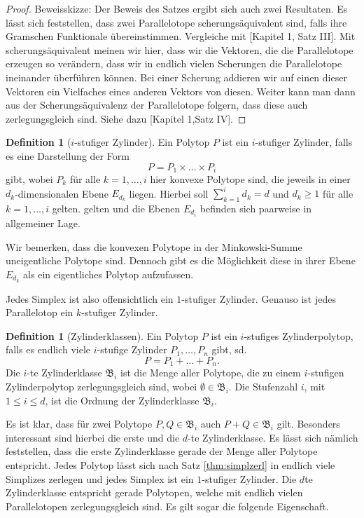 \documentclass[11pt,titlepage]{article}
\theoremstyle{definition}
\newtheorem{definition}[theorem]{Definition}
\theoremstyle{remark}
\begin{document}
	\begin{proof}
		Beweisskizze: Der Beweis des Satzes ergibt sich auch zwei 
		Resultaten. Es lässt sich feststellen, dass zwei Parallelotope 
		scherungsäquivalent sind, falls ihre Gramschen Funktionale übereinstimmen. 
		Vergleiche mit \cite{Hadwiger}[Kapitel 1, Satz III].
		Mit scherungsäquivalent meinen wir hier, dass wir die 
		Vektoren, die die Parallelotope erzeugen so verändern, dass wir 
		in endlich vielen Scherungen die Parallelotope ineinander 
		überführen können. Bei einer Scherung addieren wir auf einen 
		dieser Vektoren ein Vielfaches eines anderen Vektors von diesen.
		Weiter kann man dann aus der Scherungsäquivalenz der Parallelotope folgern, 
		dass diese auch zerlegungsgleich sind. Siehe dazu 
		\cite{Hadwiger}[Kapitel 1,Satz IV].
	\end{proof}
	
	\begin{definition}[$i$-stufiger Zylinder]
		Ein Polytop $P$ ist ein $i$-stufiger Zylinder, falls es eine Darstellung 
		der Form
		\[P=P_1 \times\ldots\times P_i\]
		gibt, wobei $P_k$ für alle $k=1,\ldots,i$ hier konvexe Polytope sind, die jeweils in einer $d_k$-dimensionalen Ebene $E_{d_k}$ liegen. Hierbei soll $\sum_{k=1}^i d_k =d$ und $d_k\geq 1$ für alle $k=1,\ldots,i$ gelten.
		gelten und die Ebenen $E_{d_i}$ befinden sich paarweise in allgemeiner Lage.
	\end{definition}
	
	Wir bemerken, dass die konvexen Polytope in der Minkowski-Summe uneigentliche 
	Polytope sind. Dennoch gibt es die Möglichkeit diese in ihrer Ebene 
	$E_{d_k}$ als ein eigentliches Polytop aufzufassen.
	
	Jedes Simplex ist also offensichtlich ein $1$-stufiger Zylinder. Genauso 
	ist jedes Parallelotop ein $k$-stufiger Zylinder. 
	
	\begin{definition}[Zylinderklassen]
		Ein Polytop $P$ ist ein $i$-stufiges Zylinderpolytop, falls 
		es endlich viele $i$-stufige Zylinder $P_1,\ldots,P_n$ gibt, sd.
		\[P=P_1+\ldots+P_n.\]
		Die $i$-te Zylinderklasse $\mathfrak{B}_i$ ist die Menge aller 
		Polytope, die zu einem $i$-stufigen Zylinderpolytop zerlegungsgleich 
		sind, wobei $\emptyset\in\mathfrak{B}_i$. 
		Die Stufenzahl $i$, mit $1\leq i\leq  d$, ist die Ordnung 
		der Zylinderklasse $\mathfrak{B}_i$.
	\end{definition}
	
	Es ist klar, dass für zwei Polytope $P,Q\in \mathfrak{B}_i$ 
	auch $P+Q\in\mathfrak{B}_i$ gilt. 
	Besonders interessant sind hierbei die erste und die $d$-te Zylinderklasse. 
	Es lässt sich nämlich feststellen, dass die erste Zylinderklasse gerade 
	der Menge aller Polytope entspricht. Jedes Polytop lässt sich nach Satz  
	\ref{thm:simplzerl} in endlich viele Simplizes zerlegen und jedes Simplex ist ein $1$-stufiger Zylinder. 
	Die $d$te Zylinderklasse entspricht gerade Polytopen, welche mit endlich vielen 
	Parallelotopen zerlegungsgleich sind. Es gilt sogar die folgende Eigenschaft.
	
\end{document}
